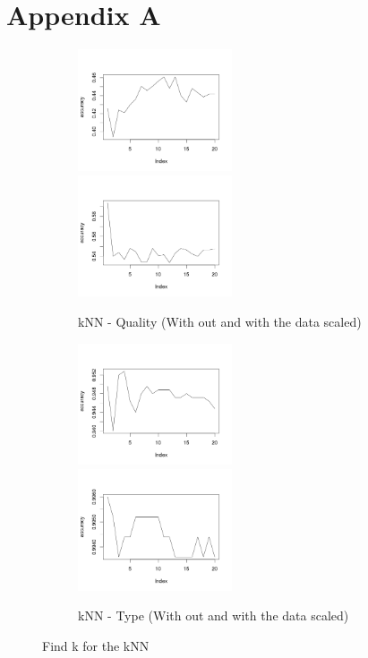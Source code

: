 \documentclass[twoside]{article}
\begin{document}
\section*{Appendix A}
\begin{figure}[H]
\centering
\begin{subfigure}[b]{\textwidth}
\includegraphics[width=0.5\textwidth]{img/KNN-Quality(Not-Scaled).png}
\includegraphics[width=0.5\textwidth]{img/KNN-Quality(Scaled).png}
\caption{kNN - Quality (With out and with the data scaled)}
\label{fig:KNN-Quality}
\end{subfigure}

\begin{subfigure}[b]{\textwidth}
\includegraphics[width=0.5\textwidth]{img/KNN-Type(Not-Scaled).png}
\includegraphics[width=0.5\textwidth]{img/KNN-Type(Scaled).png}
\caption{kNN - Type (With out and with the data scaled)}
\label{fig:KNN-TYPE}
\end{subfigure}
\caption{Find k for the kNN}
\end{figure}



\end{document}
